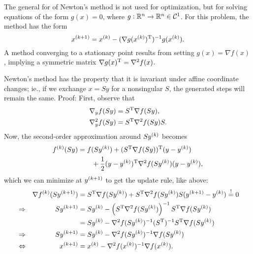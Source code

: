 \documentclass{article}
\begin{document}
\label{s:newton-equations}

The general for of Newton's method is not used for optimization, but for solving equations of the
form \(g(x) = 0\), where \(g: \RR^n \to \RR^n \in \mathcal{C}^1\).  For this problem, the method has
the form
\begin{equation*}
  \kth[k+1]{x} = \kth{x} - (\T{\nabla g(\kth{x})})^{-1} g(\kth{x}).
\end{equation*}
A method converging to a stationary point results from setting \(g(x) = \nabla f(x)\), implying a
symmetric matrix \(\T{\nabla g(x)} = \nabla^2 f(x)\).


\label{s:newton-scale}

Newton's method has the property that it is invariant under affine coordinate changes; ie., if we
exchange \(x = Sy\) for a nonsingular \(S\), the generated steps will remain the same.  Proof:
First, observe that
\begin{align*}
  \nabla_y f(Sy) &= \T{S} \nabla f(Sy), \\
  \nabla_y^2 f(Sy) &= \T{S} \nabla^2 f(Sy) S.
\end{align*}
Now, the second-order approximation around \(S\kth{y}\) becomes
\begin{align*}
  \kth{f}(Sy) &= f(S\kth{y}) + \T{(\T{S} \nabla f(Sy))}(y - \kth{y}) \\
  &\qquad + \frac{1}{2} \T{(y - \kth{y})} \nabla^2 f(S\kth{y}) (y - \kth{y}),
\end{align*}
which we can minimize at \(\kth[k+1]{y}\) to get the update rule, like above:
\begin{align*}
  & &\nabla \kth{f}(S\kth[k+1]{y}) &= \T{S} \nabla f(S\kth{y}) + \T{S} \nabla^2
                                 f(S\kth{y})S(\kth[k+1]{y}
                                 - \kth{y}) \overset{!}{=} 0 \\
  &\Rightarrow & S\kth[k+1]{y} &= S\kth{y} - \left( \T{S}\nabla^2 f(S\kth{y}) \right)^{-1} \T{S}
                                  \nabla f(S\kth{y}) \\
  &\phantom{\Rightarrow} & &= S\kth{y} - \nabla^2 f(S\kth{y})^{-1} (\T{S})^{-1}
                                 \T{S} \nabla f(S\kth{y}) \\
  &\Rightarrow & S\kth[k+1]{y} &= S\kth{y} - \nabla^2 f(S\kth{y})^{-1} \nabla f(S\kth{y}) \\
  &\Leftrightarrow & \kth[k+1]{x} &= \kth{x} - \nabla^2 f(\kth{x})^{-1} \nabla f(\kth{x}).
\end{align*}
\end{document}
